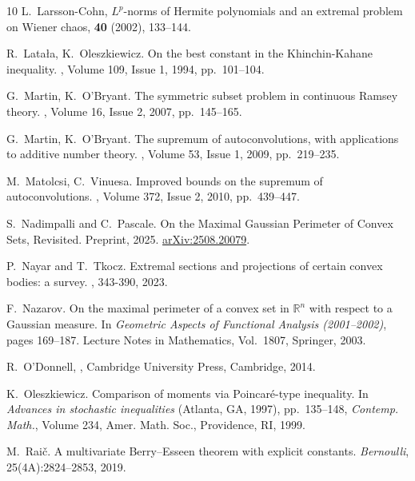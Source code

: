 \documentclass[11pt]{article}
\begin{document}
\begin{thebibliography}{10}
L.~Larsson-Cohn,
\newblock \(L^p\)-norms of Hermite polynomials and an extremal problem on Wiener chaos,
 \textbf{40} (2002), 133--144.

R.~Lata{\l}a, K.~Oleszkiewicz.
\newblock On the best constant in the Khinchin-Kahane inequality.
, Volume 109, Issue 1,
1994, pp.~101--104.

G.~Martin, K.~O'Bryant.
\newblock The symmetric subset problem in continuous Ramsey theory.
, Volume 16, Issue 2,
2007, pp.~145--165.

G.~Martin, K.~O'Bryant.
\newblock The supremum of autoconvolutions, with applications to additive number theory.
, Volume 53, Issue 1,
2009, pp.~219--235.

M.~Matolcsi, C.~Vinuesa.
\newblock Improved bounds on the supremum of autoconvolutions.
, Volume 372, Issue 2,
2010, pp.~439--447.

S.~Nadimpalli and C.~Pascale.
\newblock On the Maximal Gaussian Perimeter of Convex Sets, Revisited.
\newblock Preprint, 2025. \newblock \href{https://arxiv.org/abs/2508.20079}{arXiv:2508.20079}.

P.~Nayar and T.~Tkocz.
\newblock Extremal sections and projections of certain convex bodies: a survey.
, 343-390, 2023.

F.~Nazarov.
\newblock On the maximal perimeter of a convex set in $\mathbb{R}^n$ with respect to a Gaussian measure.
\newblock In \emph{Geometric Aspects of Functional Analysis (2001--2002)}, pages 169--187.
\newblock Lecture Notes in Mathematics, Vol.\ 1807, Springer, 2003.

R.~O'Donnell,
,
\newblock Cambridge University Press, Cambridge, 2014.

K.~Oleszkiewicz.
\newblock Comparison of moments via Poincar\'e-type inequality.
\newblock In {\em Advances in stochastic inequalities} (Atlanta, GA, 1997),
pp.~135--148, {\em Contemp. Math.}, Volume 234,
Amer. Math. Soc., Providence, RI, 1999.

M.~Rai\v{c}.
\newblock A multivariate Berry--Esseen theorem with explicit constants.
\newblock \emph{Bernoulli}, 25(4A):2824--2853, 2019.


\end{thebibliography}
\end{document}
